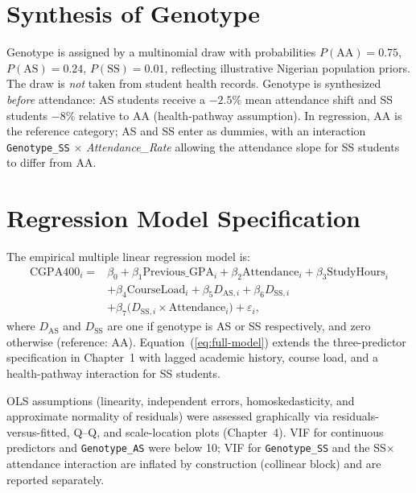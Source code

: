 \documentclass[12pt]{report}
\begin{document}
	\section{Synthesis of Genotype}
	\label{sec:genotype-synth}
	Genotype is assigned by a multinomial draw with probabilities $P(\text{AA}) = 0.75$, $P(\text{AS}) = 0.24$, $P(\text{SS}) = 0.01$, reflecting illustrative Nigerian population priors. The draw is \textit{not} taken from student health records. Genotype is synthesized \textit{before} attendance: AS students receive a $-2.5\%$ mean attendance shift and SS students $-8\%$ relative to AA (health-pathway assumption). In regression, AA is the reference category; AS and SS enter as dummies, with an interaction \texttt{Genotype\_SS} $\times$ \textit{Attendance\_Rate} allowing the attendance slope for SS students to differ from AA.
	
	\section{Regression Model Specification}
	The empirical multiple linear regression model is:
	\begin{equation}
		\begin{split}
			\text{CGPA400}_i ={} & \beta_0 + \beta_1 \text{Previous\_GPA}_i
				+ \beta_2 \text{Attendance}_i + \beta_3 \text{StudyHours}_i \\
			& + \beta_4 \text{CourseLoad}_i + \beta_5 D_{\text{AS},i}
				+ \beta_6 D_{\text{SS},i} \\
			& + \beta_7 \bigl(D_{\text{SS},i} \times \text{Attendance}_i\bigr)
				+ \varepsilon_i,
		\end{split}
		\label{eq:full-model}
	\end{equation}
	where $D_{\text{AS}}$ and $D_{\text{SS}}$ are one if genotype is AS or SS respectively, and zero otherwise (reference: AA). Equation~(\ref{eq:full-model}) extends the three-predictor specification in Chapter~1 with lagged academic history, course load, and a health-pathway interaction for SS students.
	
	OLS assumptions (linearity, independent errors, homoskedasticity, and approximate normality of residuals) were assessed graphically via residuals-versus-fitted, Q--Q, and scale-location plots (Chapter~4). VIF for continuous predictors and \texttt{Genotype\_AS} were below 10; VIF for \texttt{Genotype\_SS} and the SS$\times$attendance interaction are inflated by construction (collinear block) and are reported separately.
	
\end{document}

